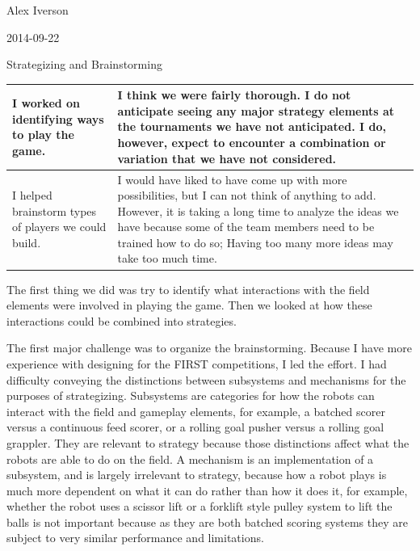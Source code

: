 Alex Iverson

2014-09-22

Strategizing and Brainstorming

\begin{tabular}{|p{5cm}|p{5cm}|}
 \hline
 I worked on identifying ways to play the game.
 &
 I think we were fairly thorough. I do not anticipate seeing any major strategy elements at the tournaments we have not anticipated. I do, however, expect to encounter a combination or variation that we have not considered.
 \\
 \hline
 I helped brainstorm types of players we could build.
 &
 I would have liked to have come up with more possibilities, but I can not think of anything to add. However, it is taking a long time to analyze the ideas we have because some of the team members need to be trained how to do so; Having too many more ideas may take too much time.
 \\
 \hline
\end{tabular}

The first thing we did was try to identify what interactions with the field elements were involved in playing the game. Then we looked at how these interactions could be combined into strategies.

The first major challenge was to organize the brainstorming. Because I have more experience with designing for the FIRST competitions, I led the effort. I had difficulty conveying the distinctions between subsystems and mechanisms for the purposes of strategizing. Subsystems are categories for how the robots can interact with the field and gameplay elements, for example, a batched scorer versus a continuous feed scorer, or a rolling goal pusher versus a rolling goal grappler. They are relevant to strategy because those distinctions affect what the robots are able to do on the field. A mechanism is an implementation of a subsystem, and is largely irrelevant to strategy, because how a robot plays is much more dependent on what it can do rather than how it does it, for example, whether the robot uses a scissor lift or a forklift style pulley system to lift the balls is not important because as they are both batched scoring systems they are subject to very similar performance and limitations.

